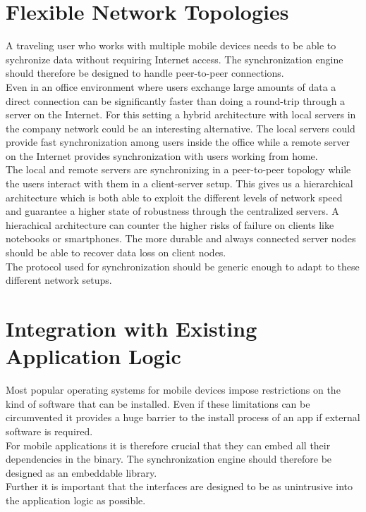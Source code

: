 \section{Flexible Network Topologies}
\label{sec:requirements.topologies}
A traveling user who works with multiple mobile devices needs to be able to sychronize data without requiring Internet access.
The synchronization engine should therefore be designed to handle peer-to-peer connections.\\
Even in an office environment where users exchange large amounts of data a direct connection can be significantly faster than doing a round-trip through a server on the Internet.
For this setting a hybrid architecture with local servers in the company network could be an interesting alternative.
The local servers could provide fast synchronization among users inside the office while a remote server on the Internet provides synchronization with users working from home.\\
The local and remote servers are synchronizing in a peer-to-peer topology while the users interact with them in a client-server setup.
This gives us a hierarchical architecture which is both able to exploit the different levels of network speed and guarantee a higher state of robustness through the centralized servers.
A hierachical architecture can counter the higher risks of failure on clients like notebooks or smartphones.
The more durable and always connected server nodes should be able to recover data loss on client nodes.\\
The protocol used for synchronization should be generic enough to adapt to these different network setups.

\section{Integration with Existing Application Logic}
Most popular operating systems for mobile devices impose restrictions on the kind of software that can be installed.
Even if these limitations can be circumvented it provides a huge barrier to the install process of an app if external software is required.\\
For mobile applications it is therefore crucial that they can embed all their dependencies in the binary.
The synchronization engine should therefore be designed as an embeddable library.\\
Further it is important that the interfaces are designed to be as unintrusive into the application logic as possible.\\

